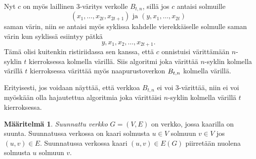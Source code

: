 \documentclass[finnish]{tktltiki2}
\theoremstyle{definition}
\newtheorem{maar}[lau]{Määritelmä}
\theoremstyle{remark}
\begin{document}
Nyt $c$ on myös laillinen 3-väritys verkolle $B_{t,n}$, sillä jos $c$ antaisi
solmuille
%
\begin{equation*}
    (x_1, \dots, x_{2t}, x_{2t+1}) \text{ ja } (y,x_1,\dots,x_{2t})
\end{equation*}
%
saman värin, niin se antaisi myös syklissa kahdelle vierekkäiselle solmulle
saman värin kun syklissä esiintyy pätkä
%
\begin{equation*}
    y, x_1, x_2, \dots, x_{2t+1}.
\end{equation*}
%
Tämä olisi kuitenkin ristiriidassa sen kanssa, että $c$ onnistuisi värittämään
$n$-syklin $t$ kierroksessa kolmella värillä. Siis algoritmi joka värittää
$n$-syklin kolmella värillä $t$ kierroksessa värittää myös naapurustoverkon
$B_{t,n}$ kolmella värillä.

Erityisesti, jos voidaan näyttää, että verkkoa $B_{t,n}$ ei voi 3-värittää, niin ei voi
myös\-kään olla hajautettua algoritmia joka värittäisi $n$-syklin kolmella
värillä $t$ kierroksessa.


\begin{maar}
    \emph{Suunnattu verkko} $G = (V,E)$ on verkko, jossa kaarilla on suunta.
    Suunnatussa verkossa on kaari solmusta $u \in V$ solmuun $v \in V$ jos
    $(u,v) \in E$. Suunnatussa verkossa kaari $(u,v) \in E(G)$ piirretään
    nuolena solmusta $u$ solmuun $v$.
\end{maar}


\begin{center}
\end{center}
\end{document}
